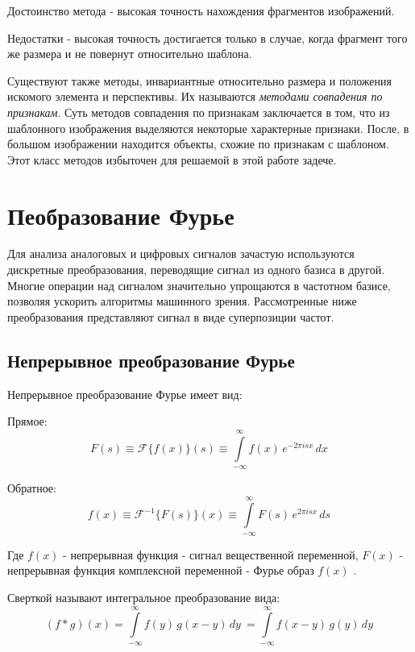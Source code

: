 \documentclass[oneside,final,14pt]{extreport}
\begin{document}
Достоинство метода  - высокая точность нахождения фрагментов изображений.

Недостатки - высокая точность достигается только в случае, когда фрагмент того же размера и не повернут относительно шаблона. 
	
	Существуют также методы, инвариантные относительно размера и положения искомого элемента и перспективы. Их называются \textit{методами совпадения по признакам}. Суть методов совпадения по признакам заключается в том, что из шаблонного изображения выделяются некоторые характерные признаки. После, в большом изображении находится объекты, схожие по признакам с шаблоном. Этот  класс методов избыточен для решаемой в этой работе задече.
	
\chapter{Пеобразование Фурье}
Для анализа аналоговых и цифровых сигналов зачастую используются дискретные преобразования, переводящие сигнал из одного базиса в другой. Многие операции над сигналом значительно упрощаются в частотном базисе, позволяя ускорить алгоритмы машинного зрения. Рассмотренные ниже преобразования представляют сигнал в виде суперпозиции частот. 
\section{Непрерывное преобразование Фурье}


Непрерывное преобразование Фурье имеет вид: 

Прямое:
\begin{equation}
F(s) 
\equiv
\mathcal{F}\{f(x)\}(s)
\equiv
{\int\limits_{-\infty}^{\infty}f(x)\,e^{-2\pi i s x}\,dx~}
\end{equation}

Обратное: 
\begin{equation}
f(x) 
\equiv
\mathcal{F}^{-1}\{F(s)\}(x)
\equiv
{\int\limits_{-\infty}^{\infty}F(s)\,e^{2\pi i s x}\,ds~}
\end{equation}

Где $f(x)$ - непрерывная функция - сигнал вещественной переменной,
$F(x)$ - непрерывная функция комплексной переменной - Фурье образ $f(x)$ \cite{Gonzalez}. 

Сверткой называют интегральное преобразование вида:
\begin{equation}
(f*g)(x)
=
{\int\limits_{-\infty}^{\infty} f(y)\,g(x-y)\,dy~} 
=
{\int\limits_{-\infty}^{\infty} f(x-y)\,g(y)\,dy~}  
\end{equation}
\end{document}
